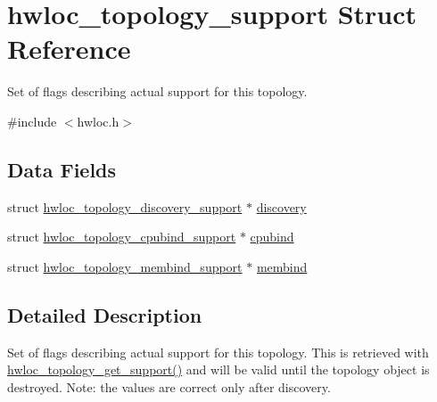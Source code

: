 \hypertarget{a00026}{
\section{hwloc\_\-topology\_\-support Struct Reference}
\label{a00026}
}


Set of flags describing actual support for this topology.  




{\ttfamily \#include $<$hwloc.h$>$}

\subsection*{Data Fields}
\begin{DoxyCompactItemize}
\item 
struct \hyperlink{a00024}{hwloc\_\-topology\_\-discovery\_\-support} $\ast$ \hyperlink{a00026_aea3fbd7653d987d81f848636c420504d}{discovery}
\item 
struct \hyperlink{a00023}{hwloc\_\-topology\_\-cpubind\_\-support} $\ast$ \hyperlink{a00026_adef2bb91f74c3e70a2a071393caf5f56}{cpubind}
\item 
struct \hyperlink{a00025}{hwloc\_\-topology\_\-membind\_\-support} $\ast$ \hyperlink{a00026_ac6eb62ae8bc0a68dce679a7107a36194}{membind}
\end{DoxyCompactItemize}


\subsection{Detailed Description}
Set of flags describing actual support for this topology. This is retrieved with \hyperlink{a00044_gac2126e105f3ae708efca2e90d612625a}{hwloc\_\-topology\_\-get\_\-support()} and will be valid until the topology object is destroyed. Note: the values are correct only after discovery. 

